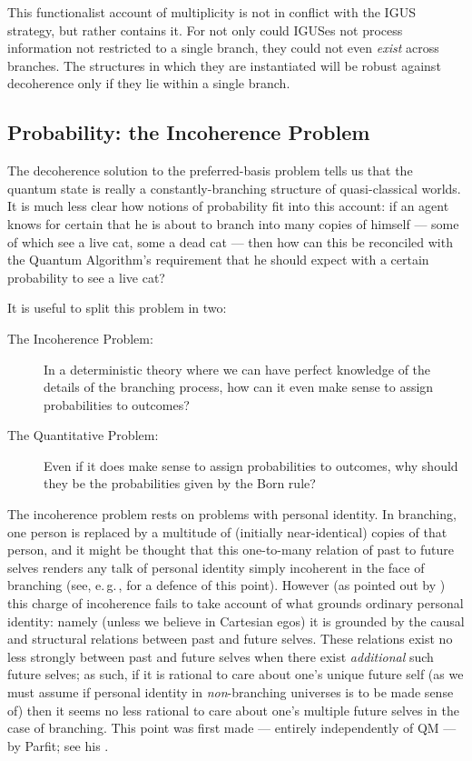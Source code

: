 \documentclass[12pt]{article}
\newcommand{\egc}{\mbox{e.\,g.\,}}
\begin{document}
This functionalist account of multiplicity is not in conflict with the IGUS strategy, but rather contains it. For not only could IGUSes not process information not restricted to a single branch, they could not even \emph{exist} across branches. The structures in which they are instantiated will be robust against decoherence only if they lie within a single branch. 

\subsection{Probability: the Incoherence Problem}

The decoherence solution to the preferred-basis problem tells us that the quantum state is really a constantly-branching structure of quasi-classical worlds. It is much less clear how notions of probability fit into this account: if an agent knows for certain that he is about to branch into many copies of himself --- some of which see a live cat, some a dead cat --- then how can this be reconciled with the Quantum Algorithm's requirement that he should expect with a certain probability to see a live cat?

It is useful to split this problem in two:
\begin{description}
\item[The Incoherence Problem:] In a deterministic theory where we can have perfect knowledge of the details of the branching process, how can it even make sense to
assign probabilities to outcomes?
\item[The Quantitative Problem:]Even if it does make sense to assign
probabilities to outcomes, why should they be the probabilities given by the
Born rule?
\end{description}

The incoherence problem rests on problems with personal identity. In branching, one person is replaced by a multitude of (initially near-identical) copies of that person, and it might be thought that this one-to-many relation of past to future selves renders any talk of personal identity simply incoherent in the face of branching (see, \egc,  for a defence of this point). 
However (as pointed out by ) this charge of incoherence fails to take account of what grounds ordinary personal identity: namely (unless we believe in Cartesian egos) it is grounded by the causal and structural relations between past and future selves. These relations exist no less strongly between past and future selves when there exist \emph{additional} such future selves; as such, if it is rational to care about one's unique future self (as we must assume if personal identity in \emph{non}-branching universes is to be made sense of) then it seems no less rational to care about one's multiple future selves in the case of branching. This point was first made --- entirely independently of QM --- by Parfit; see his \citeyear{parfitbook}. 
\end{document}
